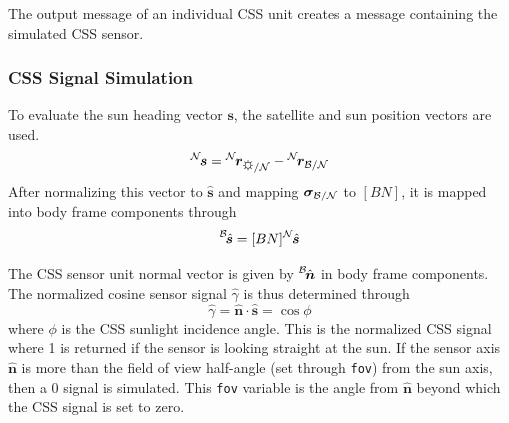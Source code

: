 The output message of an individual CSS unit creates a message containing the simulated CSS sensor.


\subsubsection{CSS Signal Simulation}
To evaluate the sun heading vector $\bm s$, the satellite and sun position vectors are used.
\begin{equation}
	\leftexp{N}{\bm s} = \leftexp{N}{\bm r}_{\sun/\mathcal{N}} - \leftexp{N}{\bm r}_{\cal B/N}
\end{equation}
After normalizing this vector to $\hat{\bm s}$ and mapping $\bm\sigma_{\cal B/N}$ to $[BN]$, it is mapped into body frame components through
\begin{equation}
	\leftexp{B}{\hat{\bm s}} = [BN] \leftexp{N}{\hat{\bm s}}
\end{equation}

The CSS sensor unit normal vector is given by $\leftexp{B}{\hat{\bm n}}$ in body frame components.  The normalized cosine sensor signal $\hat\gamma$ is thus determined through
\begin{equation}
	\hat \gamma = \hat{\bm n} \cdot \hat{\bm s} = \cos\phi
\end{equation}
where $\phi$ is the CSS sunlight incidence angle.  
This is the normalized CSS signal where 1 is returned if the sensor is looking straight at the sun.  If the sensor axis $\hat{\bm n}$ is more than the field of view half-angle (set through {\tt fov}) from the sun axis, then a 0 signal is simulated.  This {\tt fov} variable is the angle from $\hat{\bm n}$ beyond which the CSS signal is set to zero.  

